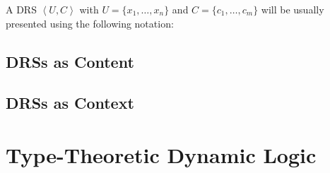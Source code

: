 \begin{notation}
  A DRS $\left< U, C \right>$ with $U = \{ x_1, \ldots, x_n \}$ and
  $C = \{ c_1, \ldots, c_m \}$ will be usually presented using the
  following notation:

\end{notation}


\subsection{DRSs as Content}
\label{ssec:drt-content}




\subsection{DRSs as Context}
\label{ssec:drt-context}




\section{Type-Theoretic Dynamic Logic}
\label{sec:ttdl}
